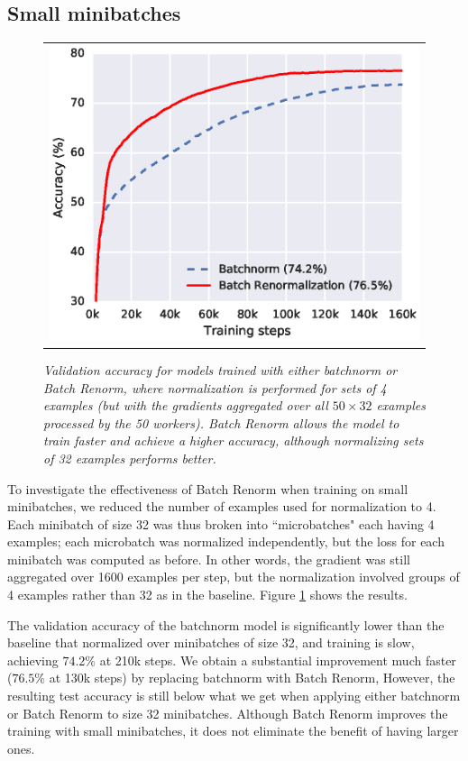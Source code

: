 \subsection{Small minibatches}
\begin{figure}
    \centering
    \begin{tabular}{@{}c@{}}
\includegraphics[width=\columnwidth]{small.eps}
\end{tabular} 
    \caption{\em Validation accuracy for models trained with either batchnorm or Batch Renorm, where normalization is performed for sets of 4 examples (but with the gradients aggregated over all $50\times 32$ examples processed by the 50 workers). Batch Renorm allows the model to train faster and achieve a higher accuracy, although normalizing sets of 32 examples performs better.
    }
    \label{fig-small}
\end{figure}

To investigate the effectiveness of Batch Renorm when training on small minibatches, we reduced the number of examples  used for normalization to 4. Each minibatch of size 32 was thus broken into ``microbatches" each having 4 examples; each microbatch was normalized independently, but the loss for each minibatch was computed as before. In other words, the gradient was still aggregated over 1600 examples per step, but the normalization involved groups of 4 examples rather than 32 as in the baseline. Figure \ref{fig-small} shows the results.

The validation accuracy of the batchnorm model is significantly lower than the baseline that normalized over minibatches of size 32, and training is slow, achieving $74.2\%$ at 210k steps. We obtain a substantial improvement much faster ($76.5\%$ at 130k steps) by replacing batchnorm with Batch Renorm, However, the resulting test accuracy is still below what we get when applying either batchnorm or Batch Renorm to size 32 minibatches. Although Batch Renorm improves the training with small minibatches, it does not eliminate the benefit of having larger ones.

